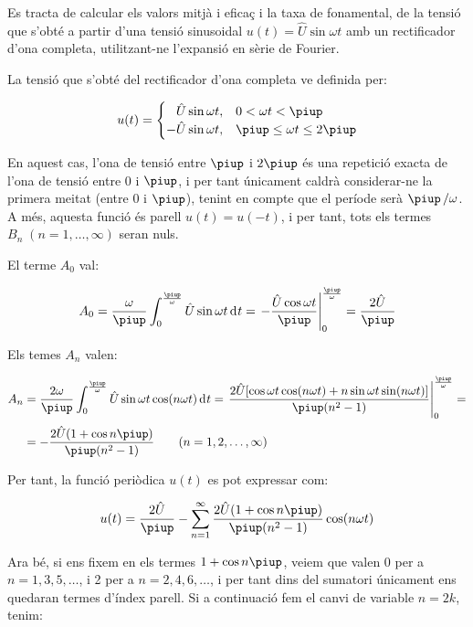 \begin{exemple}
    Es tracta de calcular els valors mitjà i eficaç i la taxa de
    fonamental, de la tensió que s'obté a partir d'una tensió
    sinusoidal $u(t) = \hat{U} \sin\omega t$ amb un rectificador d'ona
    completa, utilitzant-ne l'expansió en sèrie de Fourier.

    La tensió que s'obté del rectificador d'ona completa ve definida
    per:

    \[
    u(t) = \begin{cases} \phantom{-}\hat{U} \sin\omega t, & 0 < \omega t < \piup\\
           -\hat{U} \sin\omega t, & \piup \leq \omega t \leq 2\piup \end{cases}
    \]

    En aquest cas, l'ona de tensió entre $\piup$ i $2\piup$ és una repetició
    exacta de l'ona de tensió entre 0 i $\piup$, i per tant únicament
    caldrà considerar-ne la primera meitat (entre 0 i $\piup$), tenint en
    compte que el període serà $\piup\,/\omega$. A més, aquesta funció és
    parell $u(t) = u(-t)$, i per tant, tots els termes
    $B_n\;(n=1,\ldots,\infty)$ seran nuls.

    El terme $A_0$ val:

    \[
    A_0 = \frac{\omega}{\piup} \int_0^{\frac{\piup}{\omega}} \hat{U} \sin
    \omega t \diff t = \left. -\frac{\hat{U} \cos \omega t}{\piup}
    \right|_0^{\frac{\piup}{\omega}} = \frac{2\hat{U}}{\piup}
    \]

    Els temes $A_n$ valen:

    \[
    \begin{split}
    A_n &= \frac{2 \omega}{\piup} \int_0^{\frac{\piup}{\omega}} \hat{U} \sin
    \omega t \cos(n \omega t)\diff t = \left. \frac{2 \hat{U}[ \cos
    \omega t \cos (n \omega t) + n \sin \omega t \sin(n \omega
    t)]}{\piup(n^2-1)} \right|_0^{\frac{\piup}{\omega}}=\\[0.5ex]
    &= -\frac{2\hat{U}(1+\cos n \piup)}{\piup(n^2-1)}
    \qquad(n=1,2,\ldots,\infty)
    \end{split}
    \]

    Per tant, la funció periòdica $u(t)$ es pot expressar com:

    \[
        u(t) = \frac{2\hat{U}}{\piup} - \sum_{n=1}^\infty
         \frac{2\hat{U}(1+\cos n \piup)}{\piup(n^2-1)} \cos(n \omega t)
    \]

    Ara bé, si ens fixem en els termes $1+\cos n \piup$, veiem que valen 0
    per a $n=1,3,5,\ldots$, i 2 per a $n=2,4,6,\ldots$, i per tant dins
    del sumatori únicament ens quedaran termes d'índex parell. Si a
    continuació fem el canvi de variable $n=2k$, tenim:


\end{exemple}
